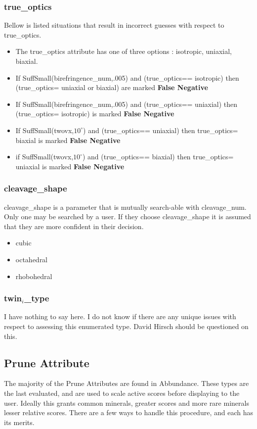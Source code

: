 \documentclass{article}
\newcommand{\SSm}[2]{SuffSmall(#1,#2)}
\def \DH{David Hirsch\xspace}
\def \Ab{Abbundance\xspace}
\def \PruneA{Prune Attribute\xspace}
\def \cs{cleavage\_shape\xspace}
\def \twt{twin$_i$\_type\xspace}
\def \to{true\_optics\xspace}
\def \tvx{twovx\xspace}
\def \cn{cleavage\_num\xspace}
\def \b{birefringence\_num\xspace}
\def \FP{{\bf False Negative}\xspace}
\begin{document}
\subsubsection*{\to}
Bellow is listed situations that result in incorrect guesses with respect to \to.
\scriptsize

\def \iso{isotropic\xspace}
\def \uni{uniaxial\xspace}
\def \bia{biaxial\xspace}
\begin{itemize}
\item The \to attribute has one of three options : \iso, \uni, \bia.
\item If \SSm{\b}{.005} and (\to == \iso) then (\to = \uni or \bia) are marked \FP
\item If \SSm{\b}{.005} and (\to == \uni) then (\to = \iso) is marked \FP
\item If \SSm{\tvx}{$10^\circ$} and (\to == \uni) then \to = \bia is marked \FP 
\item if \SSm{\tvx}{$10^\circ$} and (\to == \bia) then \to = \uni is marked \FP 
\end{itemize}


\normalsize
\subsubsection*{\cs}
\def \cub{cubic\xspace}
\def \oct{octahedral\xspace}
\def \rho{rhobohedral\xspace}
\cs is a parameter that is mutually search-able with \cn. Only one may be searched by a user. If they choose \cs it is assumed that they are more confident in their decision. 
\small
\begin{itemize}
\item \cub
\item \oct
\item \rho
\end{itemize}
\normalsize
\subsubsection*{\twt}
I have nothing to say here. I do not know if there are any unique issues with respect to assessing this enumerated type. \DH should be questioned on this.
 
\subsection*{\PruneA}
\def \occ{world\_occurrence\xspace}

The majority of the \PruneA{}s are found in \Ab. These types are the last evaluated, and are used to scale active scores before displaying to the user. Ideally this grants common minerals, greater scores and more rare minerals lesser relative scores. There are a few ways to handle this procedure, and each has its merits. 
\end{document}
